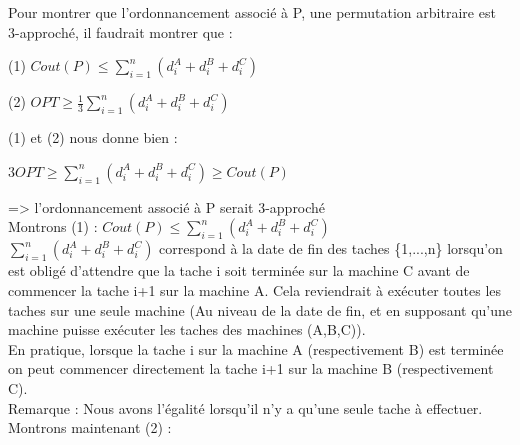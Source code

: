 \documentclass[12pt]{article}
\begin{document}
Pour montrer que l'ordonnancement associé à P, une permutation arbitraire est 3-approché, il faudrait montrer que : \\
\begin{center}
(1) $Cout(P) \le \displaystyle\sum_{i=1}^n(d_i^A+d_i^B+d_i^C)$\\
\end{center}
\begin{center}
(2) $OPT \ge \frac{1}{3}\displaystyle\sum_{i=1}^n(d_i^A+d_i^B+d_i^C)$\\
\end{center}
(1) et (2) nous donne bien :\\
\begin{center}
$3OPT \ge \displaystyle\sum_{i=1}^n(d_i^A+d_i^B+d_i^C) \ge Cout(P)$\\
\end{center}
=> l'ordonnancement associé à P serait 3-approché\\

Montrons (1) : $Cout(P) \le \displaystyle\sum_{i=1}^n(d_i^A+d_i^B+d_i^C)$\\

$\displaystyle\sum_{i=1}^n(d_i^A+d_i^B+d_i^C)$ correspond à la date de fin des taches \{1,...,n\} lorsqu'on est obligé d'attendre que la tache i soit terminée sur la machine C avant de commencer la tache i+1 sur la machine A. Cela reviendrait à exécuter toutes les taches sur une seule machine (Au niveau de la date de fin, et en supposant qu'une machine puisse exécuter les taches des machines (A,B,C)). \\

En pratique, lorsque la tache i sur la machine A (respectivement B) est terminée on peut commencer directement la tache i+1 sur la machine B (respectivement C).\\

Remarque : Nous avons l'égalité lorsqu'il n'y a qu'une seule tache à effectuer.\\

Montrons maintenant (2) :\\
\end{document}
